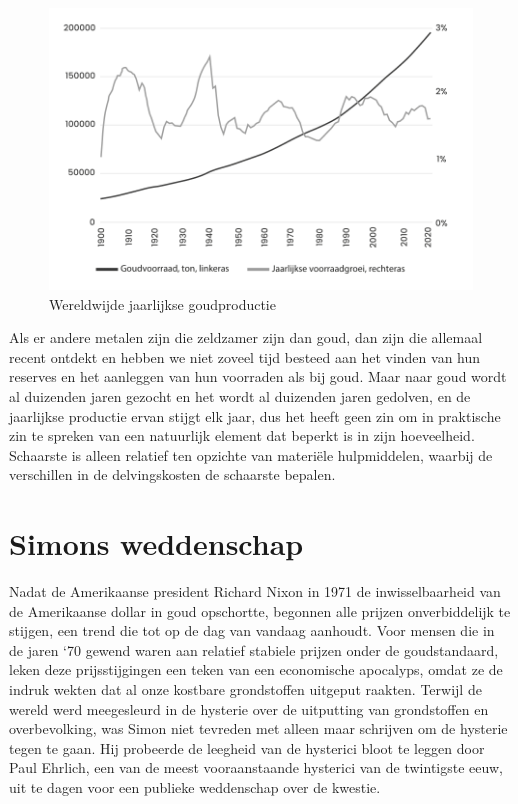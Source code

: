 \begin{figure}[!htb]
\centering
    \includegraphics[width=\textwidth]{figures/fig6-1.png}
\caption[Wereldwijde jaarlijkse goudproductie]{Wereldwijde jaarlijkse goudproductie\footnotemark}
\label{fig6}
\end{figure}

Als er andere metalen zijn die zeldzamer zijn dan goud, dan zijn die
allemaal recent ontdekt en hebben we niet zoveel tijd besteed aan het
vinden van hun reserves en het aanleggen van hun voorraden als bij goud.
Maar naar goud wordt al duizenden jaren gezocht en het wordt al duizenden jaren gedolven, en de
jaarlijkse productie ervan stijgt elk jaar, dus het heeft geen zin om in
praktische zin te spreken van een natuurlijk element dat beperkt is in
zijn hoeveelheid. Schaarste is alleen relatief ten opzichte van
materiële hulpmiddelen, waarbij de verschillen in de delvingskosten de
schaarste bepalen.


\section{Simons weddenschap}

Nadat de Amerikaanse president Richard Nixon in 1971 de inwisselbaarheid
van de Amerikaanse dollar in goud opschortte, begonnen alle prijzen
onverbiddelijk te stijgen, een trend die tot op de dag van vandaag
aanhoudt. Voor mensen die in de jaren `70 gewend waren aan relatief
stabiele prijzen onder de goudstandaard, leken deze prijsstijgingen een
teken van een economische apocalyps, omdat ze de indruk wekten dat al
onze kostbare grondstoffen uitgeput raakten. Terwijl de wereld werd
meegesleurd in de hysterie over de uitputting van grondstoffen en
overbevolking, was Simon niet tevreden met alleen maar schrijven om de
hysterie tegen te gaan. Hij probeerde de leegheid van de hysterici bloot
te leggen door Paul Ehrlich, een van de meest vooraanstaande hysterici
van de twintigste eeuw, uit te dagen voor een publieke weddenschap over
de kwestie.

